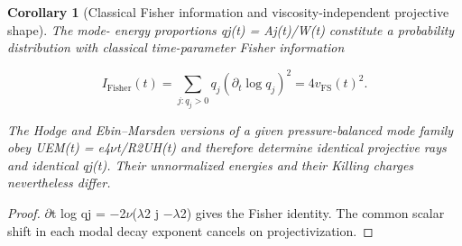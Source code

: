 \documentclass[10pt,letterpaper]{article}
\newtheorem{corollary}[theorem]{Corollary}
\theoremstyle{remark}
\begin{document}
\begin{corollary}[Classical Fisher information and viscosity-independent projective shape]

The mode- energy proportions qj(t) = Aj(t)/W(t) constitute a probability distribution with classical time-parameter Fisher information


\begin{equation}
\tag{77}\label{eq:77}
I_{\mathrm{Fisher}}(t)=\sum_{j:q_j>0}q_j(\partial_t\log q_j)^2=4v_{\mathrm{FS}}(t)^2.
\end{equation}

The Hodge and Ebin–Marsden versions of a given pressure-balanced mode family obey UEM(t) = e4\(\nu \)t/R2UH(t) and therefore determine identical projective rays and identical qj(t). Their unnormalized energies and their Killing charges nevertheless differ.


\end{corollary}

\begin{proof}
\(\partial \)t log qj = \(- \)2\(\nu \)(\(\lambda \)2 j \(- \lambda \)2) gives the Fisher identity. The common scalar shift in each modal decay exponent cancels on projectivization.

\end{proof}
\end{document}
